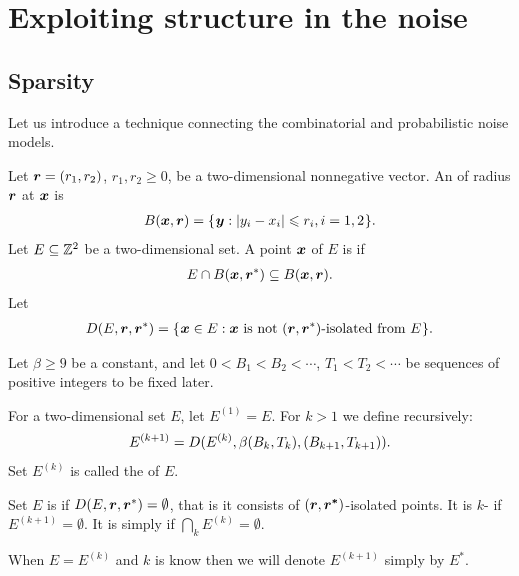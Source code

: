 \documentclass[12pt]{memoir}
\def\B{B}
\newcommand{\Tu}{T}
\newcommand{\Z}{Z}
\begin{document}


\section{Exploiting structure in the noise}\label{sec:noise}

\subsection{Sparsity}
Let us introduce a technique connecting the combinatorial and probabilistic
noise models.

\begin{definition}
Let \( \boldsymbol{r}=(r_1,r_2) \), \( r_1, r_2\ge 0 \),
be a two-dimensional nonnegative vector.
An  of radius \( \boldsymbol{r} \)  at \( \boldsymbol{x} \) is
\begin{align}\label{eq:ball1}
  B(\boldsymbol{x},\boldsymbol{r}) = \mathopen\{\mskip 1mu\boldsymbol{y} : |y_i - x_i| \leqslant r_i, i=1,2\mskip 1mu\mathclose\}.
\end{align}  
Let \( E\subseteq \mathbb{Z}^{2} \) be a two-dimensional set.
A point \( \boldsymbol{x} \) of \( E \) is  if
\begin{align*}
  E \cap B(\boldsymbol{x},\boldsymbol{r}^*)\subseteq B(\boldsymbol{x}, \boldsymbol{r}).
 \end{align*}
  Let
\begin{align}
  D(E,\boldsymbol{r}, \boldsymbol{r}^*) =
     \mathopen\{\mskip 1mu\boldsymbol{x}\in E : \boldsymbol{x} \text{\rmfamily\mdseries\upshape{ is not }} (\boldsymbol{r}, \boldsymbol{r}^*)\text{\rmfamily\mdseries\upshape{-isolated
  from }} E\mskip 1mu\mathclose\}.
\end{align}
\end{definition}

\begin{definition}[Sparsity]\label{def:sparsity}
Let \( \beta\ge 9 \) be a constant, and let 
\( 0<\B_{1}<\B_{2}<\dotsm \), \( \Tu_{1}<\Tu_{2}<\dotsm \) be 
sequences of positive integers to be fixed later.

For a two-dimensional set \( E \), let \( E^{(1)} = E \).
For \( k>1 \) we define recursively:
\begin{align}\label{eq:noise^k}
    E^{(k+1)} = D(E^{(k)}, \beta\pair{\B_k}{\Tu_{k}}, \pair{\B_{k+1}}{\Tu_{k+1}}).
\end{align}
Set \( E^{(k)} \) is called the  of \( E \).

Set \( E \) is  
if \( D(E, \boldsymbol{r}, \boldsymbol{r}^*)=\emptyset \), that is 
it consists of \( (\boldsymbol{r}, \boldsymbol{r^*}) \)-isolated points.
It is \( k \)- if \( E^{(k+1)}=\emptyset \).
It is simply  if \( \bigcap_{k}E^{(k)}=\emptyset \).

When \( E=E^{(k)} \) and \( k \) is know then we will denote \( E^{(k+1)} \) simply by \( E^{*} \).
\end{definition}
\end{document}

